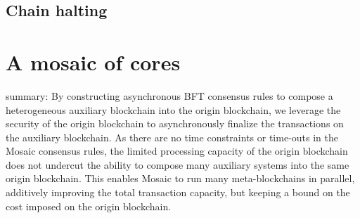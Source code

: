 \documentclass[12pt,a4paper]{article}
\begin{document}
\subsection{Chain halting}
                                                            

%
%
\section{A mosaic of cores}

summary:
By constructing asynchronous BFT consensus rules to compose a heterogeneous auxiliary blockchain into the origin blockchain, we leverage the security of the origin blockchain to asynchronously finalize the transactions on the auxiliary blockchain.
As there are no time constraints or time-outs in the Mosaic consensus rules, the limited processing capacity of the origin blockchain does not undercut the ability to compose many auxiliary systems into the same origin blockchain.
This enables Mosaic to run many meta-blockchains in parallel, additively improving the total transaction capacity, but keeping a bound on the cost imposed on the origin blockchain.

%
%

%
%

\end{document}
